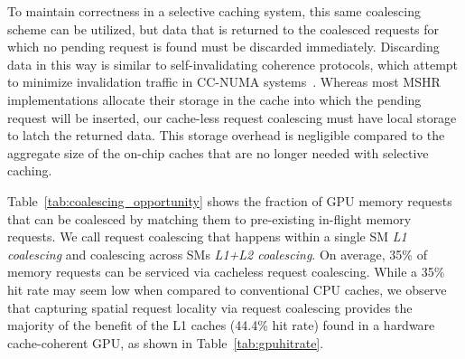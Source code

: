 To maintain correctness in a selective caching system, this same coalescing
scheme can be utilized, but data that is returned to the coalesced requests for which no pending
request is found must be discarded immediately. Discarding data in this way is similar to self-invalidating
coherence protocols, which attempt to minimize invalidation traffic in CC-NUMA
systems~\cite{Lebeck95,Lai2000}.  Whereas most MSHR implementations allocate their storage in
the cache into which the pending request will be inserted, our cache-less request coalescing must have
local storage to latch the returned data.  This storage overhead is negligible compared to the aggregate
size of the on-chip caches that are no longer needed with selective caching.

Table~\ref{tab:coalescing_opportunity} shows the fraction of GPU memory requests 
that can be coalesced by matching them to pre-existing in-flight memory requests.
We call request coalescing that happens within a single 
SM \emph{L1 coalescing} and coalescing across SMs \emph{L1+L2 coalescing}.  
On average, 35\% of memory requests can be serviced via 
cacheless request coalescing.  While a 35\% hit rate may seem low when
compared to conventional CPU caches, we observe that capturing spatial request locality
via request coalescing provides the majority of the benefit of the L1 caches (44.4\% hit rate) found
in a hardware cache-coherent GPU, as shown in Table~\ref{tab:gpuhitrate}.

